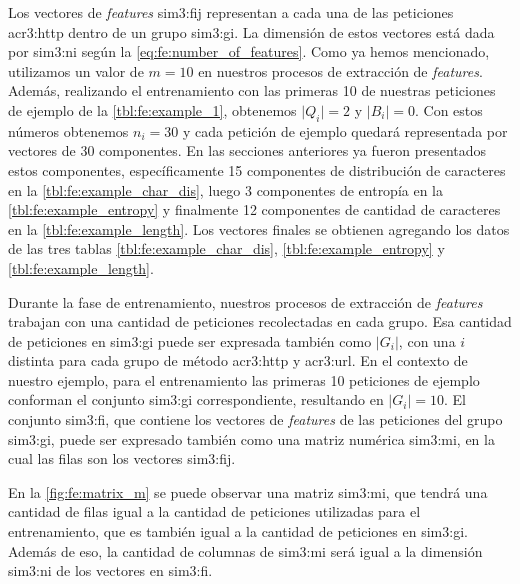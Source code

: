 Los vectores de \textit{features} \gls{sim3:fij} representan a cada una
de las peticiones \gls{acr3:http} dentro de un grupo \gls{sim3:gi}.
La dimensión de estos vectores está dada por \gls{sim3:ni} según la
\autoref{eq:fe:number_of_features}. Como ya hemos mencionado, utilizamos
un valor de $m = 10$ en nuestros procesos de extracción de \textit{features}.
Además, realizando el entrenamiento con las primeras 10 de nuestras
peticiones de ejemplo de la \autoref{tbl:fe:example_1}, obtenemos
$\lvert Q_{i} \rvert = 2$ y $\lvert B_{i} \rvert = 0$. Con estos números
obtenemos $n_{i} = 30$ y cada petición de ejemplo quedará representada
por vectores de 30 componentes.
En las secciones anteriores ya fueron presentados estos componentes,
específicamente 15 componentes de distribución de caracteres en la
\autoref{tbl:fe:example_char_dis}, luego 3 componentes de entropía en la
\autoref{tbl:fe:example_entropy} y finalmente 12 componentes de cantidad
de caracteres en la \autoref{tbl:fe:example_length}.
Los vectores finales se obtienen agregando los datos de las tres tablas
\ref{tbl:fe:example_char_dis}, \ref{tbl:fe:example_entropy} y
\ref{tbl:fe:example_length}.

Durante la fase de entrenamiento, nuestros procesos de extracción de
\textit{features} trabajan con una cantidad de peticiones recolectadas
en cada grupo. Esa cantidad de peticiones en \gls{sim3:gi} puede ser
expresada también como $\lvert G_{i} \rvert$, con una $i$ distinta para
cada grupo de método \gls{acr3:http} y \gls{acr3:url}.
En el contexto de nuestro ejemplo, para el entrenamiento las primeras 10
peticiones de ejemplo conforman el conjunto \gls{sim3:gi} correspondiente,
resultando en $\lvert G_{i} \rvert = 10$.
El conjunto \gls{sim3:fi}, que contiene los vectores de \textit{features}
de las peticiones del grupo \gls{sim3:gi}, puede ser expresado también
como una matriz numérica \gls{sim3:mi}, en la cual las filas son los
vectores \gls{sim3:fij}.

En la \autoref{fig:fe:matrix_m} se puede observar una matriz \gls{sim3:mi},
que tendrá una cantidad de filas igual a la cantidad de peticiones
utilizadas para el entrenamiento, que es también igual a la cantidad de
peticiones en \gls{sim3:gi}. Además de eso, la cantidad de columnas de
\gls{sim3:mi} será igual a la dimensión \gls{sim3:ni} de los vectores
en \gls{sim3:fi}.

